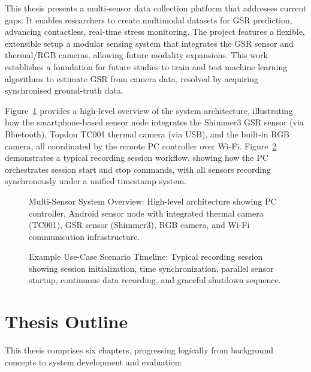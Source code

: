 This thesis presents a multi-sensor data collection platform that addresses current gaps. It enables researchers to create multimodal datasets for GSR prediction, advancing contactless, real-time stress monitoring. The project features a flexible, extensible setup \textemdash a modular sensing system \textemdash that integrates the GSR sensor and thermal/RGB cameras, allowing future modality expansions. This work establishes a foundation for future studies to train and test machine learning algorithms to estimate GSR from camera data, resolved by acquiring synchronised ground-truth data.

Figure~\ref{fig:multisensor-overview} provides a high-level overview of the system architecture, illustrating how the smartphone-based sensor node integrates the Shimmer3 GSR sensor (via Bluetooth), Topdon TC001 thermal camera (via USB), and the built-in RGB camera, all coordinated by the remote PC controller over Wi-Fi. Figure~\ref{fig:usecase-timeline} demonstrates a typical recording session workflow, showing how the PC orchestrates session start and stop commands, with all sensors recording synchronously under a unified timestamp system.

\begin{figure}[htbp]
    \centering
    \caption{Multi-Sensor System Overview: High-level architecture showing PC controller, Android sensor node with integrated thermal camera (TC001), GSR sensor (Shimmer3), RGB camera, and Wi-Fi communication infrastructure.}
    \label{fig:multisensor-overview}
\end{figure}

\begin{figure}[htbp]
    \centering
    \caption{Example Use-Case Scenario Timeline: Typical recording session showing session initialization, time synchronization, parallel sensor startup, continuous data recording, and graceful shutdown sequence.}
    \label{fig:usecase-timeline}
\end{figure}


\section{Thesis Outline}
This thesis comprises six chapters, progressing logically from background concepts to system development and evaluation:

